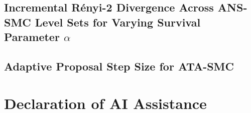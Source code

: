 \documentclass[11pt]{article}
\begin{document}
\subsection{Incremental Rényi-2 Divergence Across ANS-SMC Level Sets for Varying Survival Parameter $\alpha$}
\subsection{Adaptive Proposal Step Size for ATA-SMC}

\section{Declaration of AI Assistance}

\appendix



\end{document}

